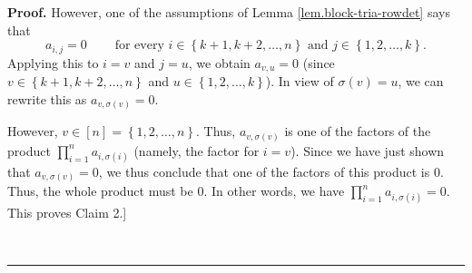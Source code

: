 \documentclass[numbers=enddot,12pt,final,onecolumn,notitlepage,english]{scrartcl}%
\theoremstyle{definition}
\newenvironment{proof}[1][Proof]{\noindent\textbf{#1.} }{\ \rule{0.5em}{0.5em}}
\let\prodnonlimits\prod
\renewcommand{\prod}{\prodnonlimits\limits}
\newenvironment{verlong}{}{}
\begin{document}
\begin{verlong}
\begin{proof}
However, one of the assumptions of Lemma \ref{lem.block-tria-rowdet} says that%
\[
a_{i,j}=0\ \ \ \ \ \ \ \ \ \ \text{for every }i\in\left\{  k+1,k+2,\ldots
,n\right\}  \text{ and }j\in\left\{  1,2,\ldots,k\right\}  .
\]
Applying this to $i=v$ and $j=u$, we obtain $a_{v,u}=0$ (since $v\in\left\{
k+1,k+2,\ldots,n\right\}  $ and $u\in\left\{  1,2,\ldots,k\right\}  $). In
view of $\sigma\left(  v\right)  =u$, we can rewrite this as $a_{v,\sigma
\left(  v\right)  }=0$.

However, $v\in\left[  n\right]  =\left\{  1,2,\ldots,n\right\}  $. Thus,
$a_{v,\sigma\left(  v\right)  }$ is one of the factors of the product
$\prod_{i=1}^{n}a_{i,\sigma\left(  i\right)  }$ (namely, the factor for
$i=v$). Since we have just shown that $a_{v,\sigma\left(  v\right)  }=0$, we
thus conclude that one of the factors of this product is $0$. Thus, the whole
product must be $0$. In other words, we have $\prod_{i=1}^{n}a_{i,\sigma
\left(  i\right)  }=0$. This proves Claim 2.] \medskip


\end{proof}
\end{verlong}
\end{document}
